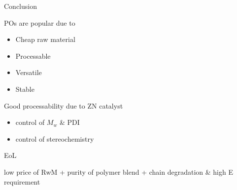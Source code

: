 

\begin{frame}{Conclusion}
    \begin{block}{POs are popular due to}
        \begin{itemize}
            \item Cheap raw material
            \item Processable 
            \item Versatile 
            \item Stable 
        \end{itemize}
    \end{block}
    \begin{greenblock}{Good processability due to ZN catalyst}
        \begin{itemize}
            \item control of $M_w$ \& PDI
            \item control of stereochemistry
        \end{itemize}
    \end{greenblock}
    \begin{alertblock}{EoL}
        \item low price of RwM + purity of polymer blend + chain degradation \& high E requirement
    \end{alertblock}

\end{frame}

